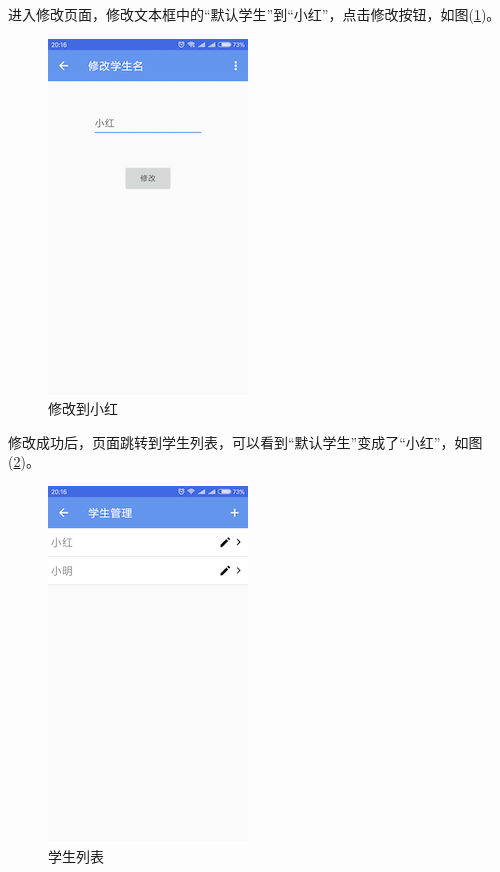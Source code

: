 进入修改页面，修改文本框中的“默认学生”到“小红”，点击修改按钮，如图(\ref{img12})。
\begin{figure}[H]
	\centering
	\includegraphics{img/12.png}
	\caption{修改到小红}
	\label{img12}
\end{figure}

修改成功后，页面跳转到学生列表，可以看到“默认学生”变成了“小红”，如图(\ref{img13})。
\begin{figure}[H]
	\centering
	\includegraphics{img/13.png}
	\caption{学生列表}
	\label{img13}
\end{figure}

